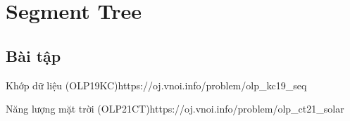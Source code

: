 \chapter{Segment Tree}

\minitoc

\section{Bài tập}

\begin{baitap}{Khớp dữ liệu (OLP19KC)}{https://oj.vnoi.info/problem/olp\_kc19\_seq}

\end{baitap}

\begin{baitap}{Năng lượng mặt trời (OLP21CT)}{https://oj.vnoi.info/problem/olp\_ct21\_solar}

\end{baitap}

